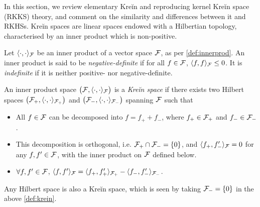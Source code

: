 In this section, we review elementary Kreĭn and reproducing kernel Kreĭn space (RKKS) theory, and comment on the similarity and differences between it and RKHSs.
Kreĭn spaces are linear spaces endowed with a Hilbertian topology, characterised by an inner product which is non-positive.

\begin{definition}
  Let $\langle\cdot,\cdot\rangle_{\mathcal F}$ be an inner product of a vector space ${\mathcal F}$, as per \cref{def:innerprod}.
  An inner product is said to be \emph{negative-definite} if for all $f\in{\mathcal F}$, $\langle f,f\rangle_{\mathcal F} \leq 0$.
  It is \emph{indefinite} if it is neither positive- nor negative-definite.
\end{definition}

\begin{definition}\label{def:krein}
  An inner product space $\big({\mathcal F},\langle\cdot,\cdot\rangle_{\mathcal F}\big)$ is a \emph{Kreĭn space} if there exists two Hilbert spaces $\big({\mathcal F}_+,\langle\cdot,\cdot\rangle_{{\mathcal F}_+}\big)$ and $\big({\mathcal F}_-,\langle\cdot,\cdot\rangle_{{\mathcal F}_-}\big)$ spanning ${\mathcal F}$ such that
  \begin{itemize}
    \item All $f\in{\mathcal F}$ can be decomposed into $f = f_+ + f_-$, where $f_+\in{\mathcal F}_+$ and $f_- \in {\mathcal F}_-$.
    \item This decomposition is orthogonal, i.e. ${\mathcal F}_+ \cap {\mathcal F}_- = \{0\}$, and $\langle f_+,f_-'\rangle_{\mathcal F}=0$ for any $f,f'\in{\mathcal F}$, with the inner product on ${\mathcal F}$ defined below.
    \item $\forall f,f'\in{\mathcal F}$, $\langle f,f'\rangle_{\mathcal F} = \langle f_+,f_+'\rangle_{{\mathcal F}_+}- \langle f_-,f_-'\rangle_{{\mathcal F}_-}$.
  \end{itemize}
\end{definition}

\begin{remark}
  Any Hilbert space is also a Kreĭn space, which is seen by taking ${\mathcal F}_- = \{0\}$ in the above \cref{def:krein}.
\end{remark}

